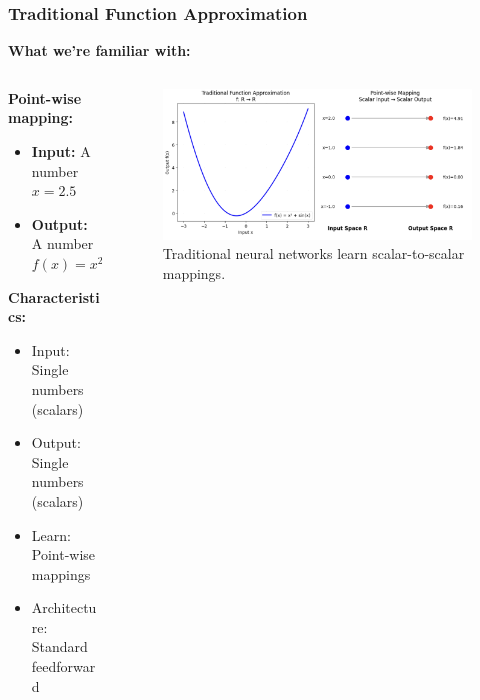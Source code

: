 \documentclass[notes]{beamer}
\begin{document}
\begin{frame}
\frametitle{Traditional Function Approximation}

\textbf{What we're familiar with:}

\begin{columns}[T]
    \begin{column}{0.5\textwidth}
        \textbf{Point-wise mapping:}
        \begin{itemize}
            \item \textbf{Input:} A number $x = 2.5$
            \item \textbf{Output:} A number $f(x) = x^2 = 6.25$
        \end{itemize}
        
        \vspace{0.5cm}
        
        \textbf{Characteristics:}
        \begin{itemize}
            \item Input: Single numbers (scalars)
            \item Output: Single numbers (scalars)
            \item Learn: Point-wise mappings
            \item Architecture: Standard feedforward
        \end{itemize}
    \end{column}
    \begin{column}{0.5\textwidth}
        \begin{figure}[ht]
            \centering
            \includegraphics[width=\linewidth]{figs/function_approximation.png}
            \caption*{Traditional neural networks learn scalar-to-scalar mappings.}
        \end{figure}
    \end{column}
\end{columns}

\end{frame}
\end{document}
